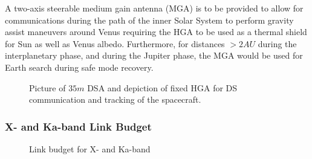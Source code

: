 A two-axis steerable medium gain antenna (MGA) is to be provided to allow for communications during the path of the inner Solar System to perform gravity assist maneuvers around Venus requiring the HGA to be used as a thermal shield for Sun as well as Venus albedo. Furthermore, for distances $>2AU$ during the interplanetary phase, and during the Jupiter phase, the MGA would be used for Earth search during safe mode recovery.

\begin{figure}[htb]
	\centering
	\caption{Picture of $35m$ DSA and depiction of fixed HGA for DS communication and tracking of the spacecraft.}
	\label{fig:DS-a}
\end{figure}

\subsubsection{X- and Ka-band Link Budget}

\begin{figure}[htb]
	\centering
	\caption{Link budget for X- and Ka-band}
\end{figure}
